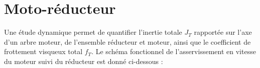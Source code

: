 

\section{Moto-réducteur}

Une étude dynamique permet de quantifier l'inertie totale $J_T$ rapportée sur l'axe d'un arbre moteur, de l'ensemble réducteur et moteur, ainsi que le coefficient de frottement visqueux total $f_T$. Le schéma fonctionnel de l'asservissement en vitesse du moteur suivi du réducteur est donné ci-dessous :


